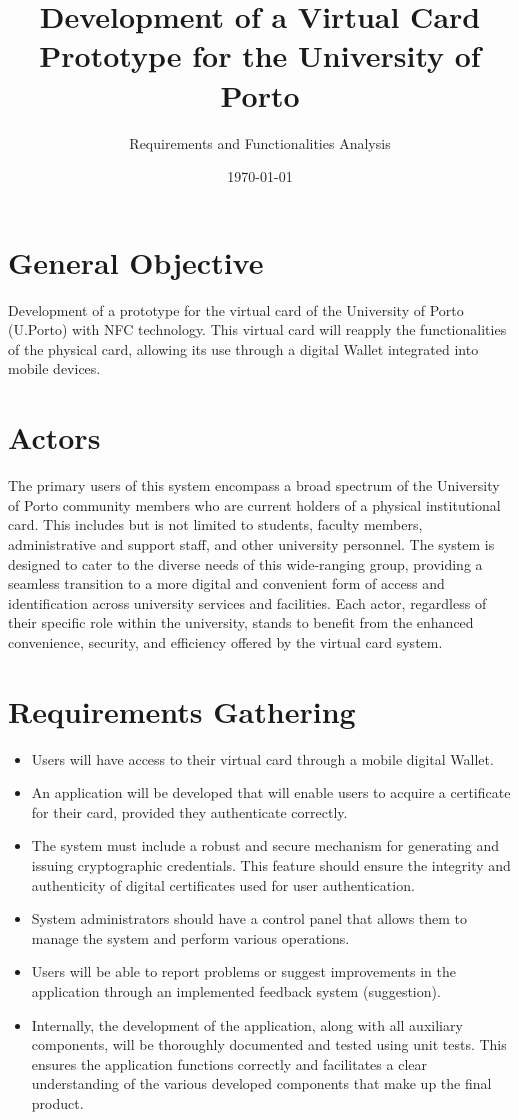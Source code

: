 \documentclass{article}
\title{Development of a Virtual Card Prototype for the University of Porto}
\author{Requirements and Functionalities Analysis}
\date{\today}
\begin{document}
\maketitle

\section*{General Objective}
Development of a prototype for the virtual card of the University of Porto (U.Porto) with NFC technology. This virtual card will reapply the functionalities of the physical card, allowing its use through a digital Wallet integrated into mobile devices.


\section*{Actors}

The primary users of this system encompass a broad spectrum of the University of Porto community members who are current holders of a physical institutional card. This includes but is not limited to students, faculty members, administrative and support staff, and other university personnel. The system is designed to cater to the diverse needs of this wide-ranging group, providing a seamless transition to a more digital and convenient form of access and identification across university services and facilities. Each actor, regardless of their specific role within the university, stands to benefit from the enhanced convenience, security, and efficiency offered by the virtual card system.


\section*{Requirements Gathering}
\begin{itemize}
    \item Users will have access to their virtual card through a mobile digital Wallet.
    \item An application will be developed that will enable users to acquire a certificate for their card, provided they authenticate correctly.
    \item The system must include a robust and secure mechanism for generating and issuing cryptographic credentials. This feature should ensure the integrity and authenticity of digital certificates used for user authentication.
    \item System administrators should have a control panel that allows them to manage the system and perform various operations.
    \item Users will be able to report problems or suggest improvements in the application through an implemented feedback system (suggestion).
    \item Internally, the development of the application, along with all auxiliary components, will be thoroughly documented and tested using unit tests. This ensures the application functions correctly and facilitates a clear understanding of the various developed components that make up the final product.
\end{itemize}
\end{document}
